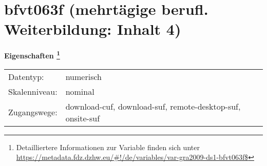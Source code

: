 
    \setcounter{footnote}{0}

    \vspace*{-1.8cm}
	\section{bfvt063f (mehrtägige berufl. Weiterbildung: Inhalt 4)}
	\label{section:bfvt063f}



    \vspace*{0.5cm}
    \noindent\textbf{Eigenschaften
	\footnote{Detailliertere Informationen zur Variable finden sich unter
		\url{https://metadata.fdz.dzhw.eu/\#!/de/variables/var-gra2009-ds1-bfvt063f$}}}\\
	\begin{tabularx}{\hsize}{@{}lX}
	Datentyp: & numerisch \\
	Skalenniveau: & nominal \\
	Zugangswege: &
	  download-cuf, 
	  download-suf, 
	  remote-desktop-suf, 
	  onsite-suf
 \\
    \end{tabularx}




